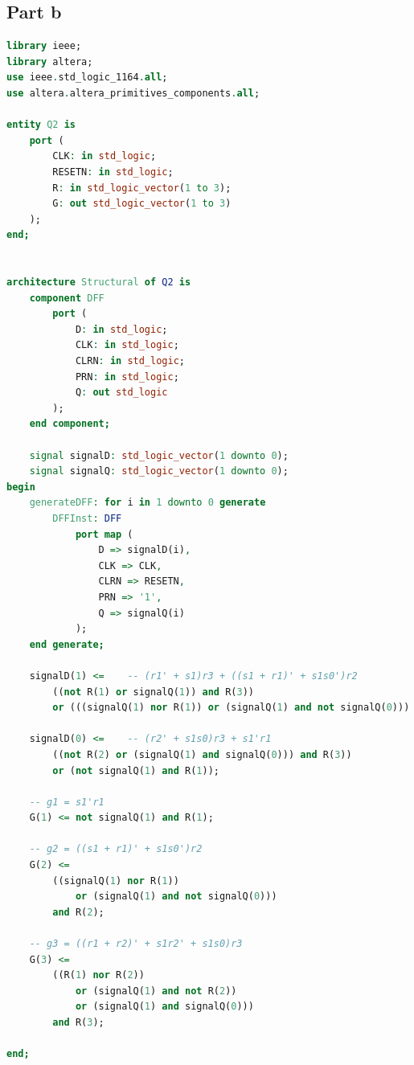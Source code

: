 \documentclass[12pt, a4paper]{article}
\begin{document}
	\subsection*{Part b}
	\begin{lstlisting}[language=vhdl]
library ieee;
library altera;
use ieee.std_logic_1164.all;
use altera.altera_primitives_components.all;

entity Q2 is
    port (
        CLK: in std_logic;
        RESETN: in std_logic;
        R: in std_logic_vector(1 to 3);
        G: out std_logic_vector(1 to 3)
    );
end;


architecture Structural of Q2 is
    component DFF
        port (
            D: in std_logic;
            CLK: in std_logic;
            CLRN: in std_logic;
            PRN: in std_logic;
            Q: out std_logic
        );
    end component;
    
    signal signalD: std_logic_vector(1 downto 0);
    signal signalQ: std_logic_vector(1 downto 0);
begin
    generateDFF: for i in 1 downto 0 generate
        DFFInst: DFF
            port map (
                D => signalD(i),
                CLK => CLK,
                CLRN => RESETN,
                PRN => '1',
                Q => signalQ(i)
            );
    end generate;

    signalD(1) <=    -- (r1' + s1)r3 + ((s1 + r1)' + s1s0')r2
        ((not R(1) or signalQ(1)) and R(3))
        or (((signalQ(1) nor R(1)) or (signalQ(1) and not signalQ(0))) and R(2));
    
    signalD(0) <=    -- (r2' + s1s0)r3 + s1'r1
        ((not R(2) or (signalQ(1) and signalQ(0))) and R(3))
        or (not signalQ(1) and R(1));
    
    -- g1 = s1'r1
    G(1) <= not signalQ(1) and R(1);
    
    -- g2 = ((s1 + r1)' + s1s0')r2
    G(2) <=
        ((signalQ(1) nor R(1))
            or (signalQ(1) and not signalQ(0)))
        and R(2);
    
    -- g3 = ((r1 + r2)' + s1r2' + s1s0)r3
    G(3) <=
        ((R(1) nor R(2))
            or (signalQ(1) and not R(2))
            or (signalQ(1) and signalQ(0)))
        and R(3);
    
end;
	\end{lstlisting}
	
\end{document}

